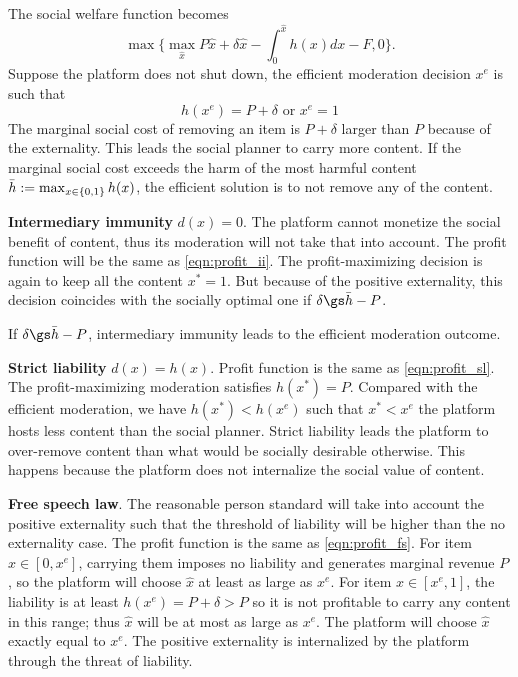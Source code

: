 The social welfare function becomes 
\begin{equation}\label{eqn:efficiency_2}
    \max\{\max_{\hat{x}}P\hat{x} +\delta\hat{x} - \int_0^{\hat{x}}h(x)dx-F, 0\}.
\end{equation}
Suppose the platform does not shut down, the efficient moderation decision $x^e$ is such that 
\begin{equation}\label{eqn:efficiency_2_soln}
    h(x^e)=P+\delta \mbox{ or } x^e=1
\end{equation}
The marginal social cost of removing an item is $P+\delta$ larger than $P$ because of the externality. This leads the social planner to carry more content. If the marginal social cost exceeds the harm of the most harmful content $\Bar{h}:=\max_{x\in\{0,1\}} h(x)$, the efficient solution is to not remove any of the content.

\textbf{Intermediary immunity} $d(x)=0$.
The platform cannot monetize the social benefit of content, thus its moderation will not take that into account. The profit function will be the same as \eqref{eqn:profit_ii}. The profit-maximizing decision is again to keep all the content $x^*=1$. But because of the positive externality, this decision coincides with the socially optimal one if $\delta\gs \Bar{h}-P$. 
\begin{proposition}
If $\delta\gs \Bar{h}-P$, intermediary immunity leads to the efficient moderation outcome.    
\end{proposition}


\textbf{Strict liability} $d(x)=h(x)$.
Profit function is the same as \eqref{eqn:profit_sl}. The profit-maximizing moderation satisfies $h(x^*)=P$. Compared with the efficient moderation, we have $h(x^*)<h(x^e)$ such that $x^*<x^e$ the platform hosts less content than the social planner. Strict liability leads the platform to over-remove content than what would be socially desirable otherwise. This happens because the platform does not internalize the social value of content.

\textbf{Free speech law}.
The reasonable person standard will take into account the positive externality such that the threshold of liability will be higher than the no externality case. The profit function is the same as \eqref{eqn:profit_fs}. For item $x\in[0,x^e]$, carrying them imposes no liability and generates marginal revenue $P$, so the platform will choose $\hat{x}$ at least as large as $x^e$. For item $x\in[x^e,1]$, the liability is at least $h(x^e)=P+\delta>P$ so it is not profitable to carry any content in this range; thus $\hat{x}$ will be at most as large as $x^e$. The platform will choose $\hat{x}$ exactly equal to $x^e$. 
The positive externality is internalized by the platform through the threat of liability.

